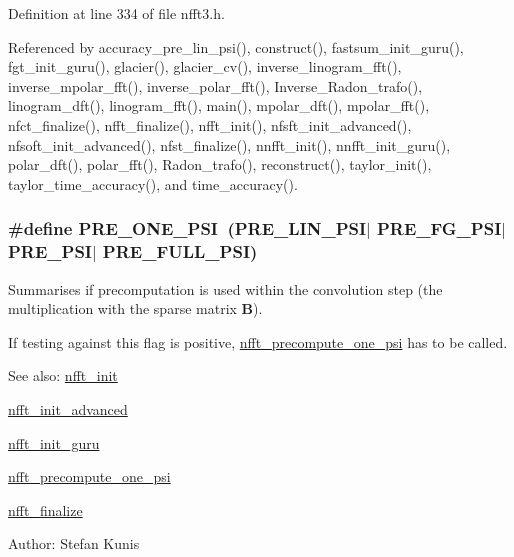 Definition at line 334 of file nfft3.h.

Referenced by accuracy\_\-pre\_\-lin\_\-psi(), construct(), fastsum\_\-init\_\-guru(), fgt\_\-init\_\-guru(), glacier(), glacier\_\-cv(), inverse\_\-linogram\_\-fft(), inverse\_\-mpolar\_\-fft(), inverse\_\-polar\_\-fft(), Inverse\_\-Radon\_\-trafo(), linogram\_\-dft(), linogram\_\-fft(), main(), mpolar\_\-dft(), mpolar\_\-fft(), nfct\_\-finalize(), nfft\_\-finalize(), nfft\_\-init(), nfsft\_\-init\_\-advanced(), nfsoft\_\-init\_\-advanced(), nfst\_\-finalize(), nnfft\_\-init(), nnfft\_\-init\_\-guru(), polar\_\-dft(), polar\_\-fft(), Radon\_\-trafo(), reconstruct(), taylor\_\-init(), taylor\_\-time\_\-accuracy(), and time\_\-accuracy().\hypertarget{group__nfft_g44c85197c6bdcf4b632aeff5e94d5329}{
\subsubsection{\setlength{\rightskip}{0pt plus 5cm}\#define PRE\_\-ONE\_\-PSI~(PRE\_\-LIN\_\-PSI$|$ PRE\_\-FG\_\-PSI$|$ PRE\_\-PSI$|$ PRE\_\-FULL\_\-PSI)}}
\label{group__nfft_g44c85197c6bdcf4b632aeff5e94d5329}


Summarises if precomputation is used within the convolution step (the multiplication with the sparse matrix $\mathbf{B}$). 

If testing against this flag is positive, \hyperlink{group__nfft_gfd7b278b6ed04d929212b4807dd195f0}{nfft\_\-precompute\_\-one\_\-psi} has to be called.

\begin{Desc}
\item[See also:]\hyperlink{group__nfft_g1dfeaf18f3735f035afa62ca768d99c4}{nfft\_\-init} 

\hyperlink{group__nfft_gcd4a22fd1f6ea476a57759a90510d114}{nfft\_\-init\_\-advanced} 

\hyperlink{group__nfft_g406f05717c6299b918261c61aaa9de23}{nfft\_\-init\_\-guru} 

\hyperlink{group__nfft_gfd7b278b6ed04d929212b4807dd195f0}{nfft\_\-precompute\_\-one\_\-psi} 

\hyperlink{group__nfft_g614f9f7af5b0d5491afa9495393c4dc3}{nfft\_\-finalize} \end{Desc}
\begin{Desc}
\item[Author:]Stefan Kunis \end{Desc}


